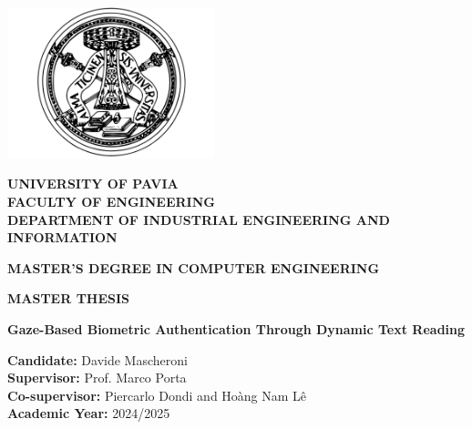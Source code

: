 \documentclass{article}
\begin{document}
\sloppy


\begin{titlepage}
    \centering

    \vspace*{1cm}
    
    \includegraphics[width=6cm]{Images/Theory/Logo_UNIPV.svg.png} 
    
    \vspace{1cm}
    
    \textbf{\Large UNIVERSITY OF PAVIA} \\
    \textbf{FACULTY OF ENGINEERING} \\
    \textbf{DEPARTMENT OF INDUSTRIAL ENGINEERING AND INFORMATION}
    
    \vspace{2cm}
    
    \textbf{\Large MASTER'S DEGREE IN COMPUTER ENGINEERING}
    
    \vspace{1.5cm}
    
    {\LARGE \textbf{MASTER THESIS}}
    
    \vspace{2cm}
  
    {\Huge \textbf{Gaze-Based Biometric Authentication Through Dynamic Text Reading}\\[0.8cm]}
    \vfill
    
    
    \begin{flushleft}
        \textbf{Candidate:} Davide Mascheroni \\
        \textbf{Supervisor:} Prof. Marco Porta \\
        \textbf{Co-supervisor:} Piercarlo Dondi and Hoàng Nam Lê \\
        \textbf{Academic Year:} 2024/2025
    \end{flushleft}
    
\end{titlepage}

\newpage
\renewcommand{\contentsname}{Table of contents}
\tableofcontents
\newpage
\end{document}
